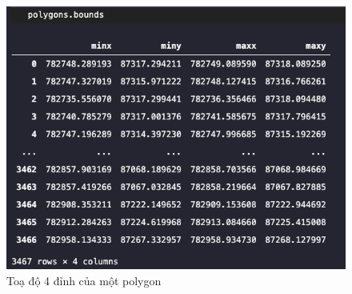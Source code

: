\documentclass[a4paper, 12pt]{report}
\begin{document}
 \begin{figure}[!h]
	\centering
	\includegraphics[width=1\linewidth]{Images/polygon_bounds}
	\caption{Toạ độ 4 đỉnh của một polygon}
	\label{fig:polygon_bounds}
\end{figure}


\end{document}
